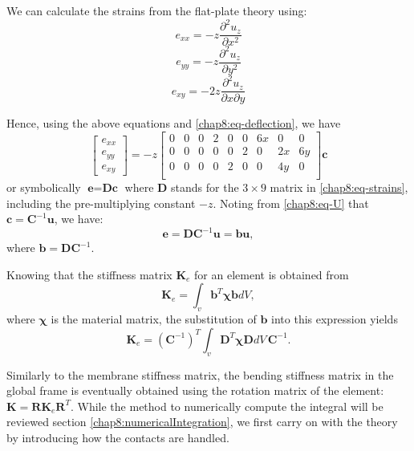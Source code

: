 \noindent We can calculate the strains from the flat-plate theory using:
\begin{equation}
e_{xx} = -z \frac{\partial^2u_z}{\partial x^2}
\end{equation} 
\begin{equation}
e_{yy} = -z \frac{\partial^2u_z}{\partial y^2}
\end{equation} 
\begin{equation}
e_{xy} = -2z \frac{\partial^2u_z}{\partial x \partial y}
\end{equation} 

\noindent Hence, using the above equations and \eqref{chap8:eq-deflection}, we have
\begin{equation}
\begin{bmatrix}
e_{xx} \\
e_{yy} \\
e_{xy}
\end{bmatrix}
= 
-z
\begin{bmatrix}
0 & 0 & 0 & 2 & 0 & 0 & 6x & 0 & 0 \\
0 & 0 & 0 & 0 & 0 & 2 & 0 & 2x & 6y \\
0 & 0 & 0 & 0 & 2 & 0 & 0 & 4y & 0 \\
\end{bmatrix}
\textbf{c}
\label{chap8:eq-strains}
\end{equation} 
or symbolically $\textbf{e} = \textbf{Dc}$ where $\textbf{D}$ stands for the $3\times 9$ matrix in \eqref{chap8:eq-strains}, including the pre-multiplying constant $-z$. Noting from \eqref{chap8:eq-U} that $\textbf{c} = \textbf{C}^{-1}\textbf{u}$, we have:
\begin{equation}
\textbf{e} = \textbf{DC}^{-1}\textbf{u} = \textbf{bu},
\end{equation} 
where $\textbf{b} = \textbf{DC}^{-1}$. 

\noindent Knowing that the stiffness matrix $\textbf{K}_e$ for an element is obtained from
\begin{equation}
\textbf{K}_e = \int_v \textbf{b}^{T} \boldsymbol\chi \textbf{b} dV,
\end{equation} 
where $\boldsymbol\chi$ is the material matrix, the substitution of $\textbf{b}$ into this expression yields
\begin{equation}
\label{chap8:Ke}
\textbf{K}_e = (\textbf{C}^{-1})^T \int_v \textbf{D}^{T} \boldsymbol\chi \textbf{D} dV \, \textbf{C}^{-1}.
\end{equation} 

Similarly to the membrane stiffness matrix, the bending stiffness matrix in the global frame is eventually obtained using the rotation matrix of the element: $\textbf{K} = \textbf{R} \textbf{K}_e \textbf{R}^{T}$. While the method to numerically compute the integral will be reviewed section \ref{chap8:numericalIntegration}, we first carry on with the theory by introducing how the contacts are handled.  


